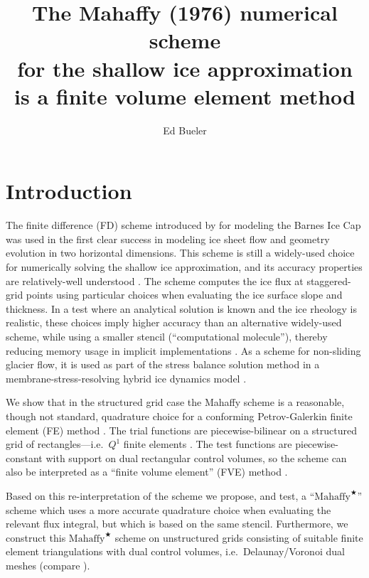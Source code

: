 \documentclass[11pt]{amsart}
\title[The Mahaffy scheme is an FVE method]{The Mahaffy (1976) numerical scheme \\ for the shallow ice approximation \\ is a finite volume element method}
\author{Ed Bueler}
\newcommand{\Mstar}{$\text{Mahaffy}^{\bigstar}$\xspace}
\begin{document}

\maketitle

\thispagestyle{empty}


\section{Introduction} \label{sec:intro}


The finite difference (FD) scheme introduced by \cite{Mahaffy1976} for modeling the Barnes Ice Cap was used in the first clear success in modeling ice sheet flow and geometry evolution in two horizontal dimensions.  This scheme is still a widely-used choice for numerically solving the shallow ice approximation, and its accuracy properties are relatively-well understood \cite{Bueleretal2005}.   The scheme computes the ice flux at staggered-grid points using particular choices when evaluating the ice surface slope and thickness.  In a test where an analytical solution is known and the ice rheology is realistic, these choices imply higher accuracy than an alternative widely-used scheme, while using a smaller stencil (``computational molecule''), thereby reducing memory usage in implicit implementations \cite{HindmarshPayne1996}.  As a scheme for non-sliding glacier flow, it is used as part of the stress balance solution method in a membrane-stress-resolving hybrid ice dynamics model \cite{BuelerBrown2009}.

We show that in the structured grid case the Mahaffy scheme is a reasonable, though not standard, quadrature choice for a conforming Petrov-Galerkin finite element (FE) method \cite{Elmanetal2005}.  The trial functions are piecewise-bilinear on a structured grid of rectangles---i.e.~$Q^1$ finite elements \cite{Elmanetal2005}.  The test functions are piecewise-constant with support on dual rectangular control volumes, so the scheme can also be interpreted as a ``finite volume element'' (FVE) method \cite{EwingLinLin2002}.

Based on this re-interpretation of the scheme we propose, and test, a ``\Mstar'' scheme which uses a more accurate quadrature choice when evaluating the relevant flux integral, but which is based on the same stencil.  Furthermore, we construct this \Mstar scheme on unstructured grids consisting of suitable finite element triangulations with dual control volumes, i.e.~Delaunay/Voronoi dual meshes (compare \cite{Ringleretal2013}).
\end{document}
